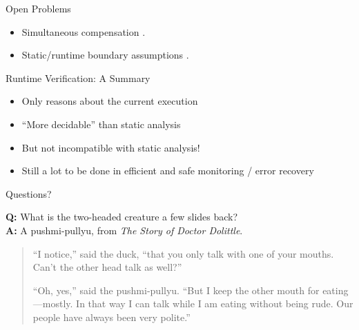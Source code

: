 \documentclass[12pt]{beamer}
\begin{document}
\begin{frame}{Open Problems}
  \begin{itemize}
    \item Simultaneous compensation \parencite{compensate}.
    \item Static/runtime boundary assumptions \parencite{explicit}.
  \end{itemize}
\end{frame}

\begin{frame}{Runtime Verification: \small A Summary}
  \begin{itemize}
    \item<1-> Only reasons about the current execution
    \item<1-> ``More decidable'' than static analysis
    \item<2-> But not incompatible with static analysis!
    \item<3-> Still a lot to be done in efficient and safe monitoring
      / error recovery
  \end{itemize}
\end{frame}

\begin{frame}{Questions?}
  \vspace{4.5cm}

  \footnotesize
  \textbf{Q:} What is the two-headed creature a few slides back?\\
  \textbf{A:} A pushmi-pullyu, from \textit{The Story of Doctor Dolittle}.

  \begin{quote}
    ``I notice,'' said the duck, ``that you only talk with one of your
    mouths. Can't the other head talk as well?''

    ``Oh, yes,'' said the pushmi-pullyu. ``But I keep the other mouth
    for eating---mostly. In that way I can talk while I am eating
    without being rude. Our people have always been very polite.''
  \end{quote}
\end{frame}
\end{document}
